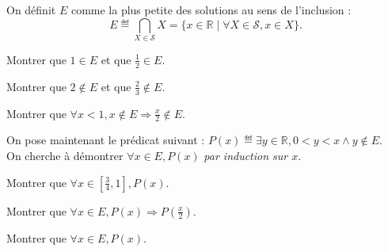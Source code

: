 \begin{exercice}
  On définit $E$ comme la plus petite des solutions au sens de l'inclusion :
  $$E \eqdef \bigcap_{X\in \mathcal{S}} X = \{x \in \mathbb{R} \mid \forall X \in \mathcal{S}, x \in X\}.$$

  \begin{questions}
  \item Montrer que $1 \in E$ et que $\frac{1}{2} \in E$.
  \item Montrer que $2 \notin E$ et que $\frac{2}{3} \notin E$.
  \item Montrer que $\forall x < 1, x\notin E \Rightarrow \frac{x}{2} \notin E$.
  \end{questions}

  On pose maintenant le prédicat suivant : $P(x) \eqdef \exists y \in \mathbb{R}, 0 < y < x \land  y\notin E$.\\
  On cherche à démontrer $\forall x\in E, P(x)$ \emph{par induction sur $x$}.
  \begin{questions}
  \item Montrer que $\forall x \in \left[\frac{3}{4}, 1\right], P(x)$.
  \item Montrer que $\forall x \in E, P(x) \Rightarrow P\left(\frac{x}{2}\right)$.
  \item Montrer que $\forall x\in E, P(x)$.
  \end{questions}

\end{exercice}

